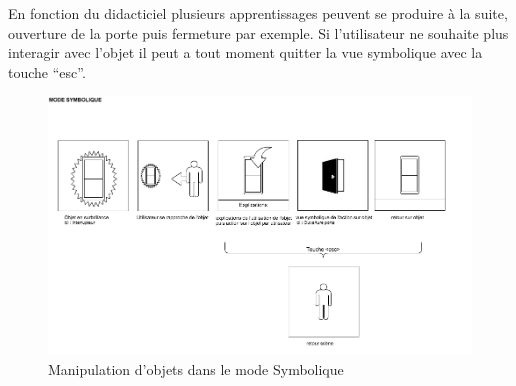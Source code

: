 En fonction du didacticiel plusieurs apprentissages peuvent se produire à la suite, ouverture de la porte puis fermeture par exemple. Si l'utilisateur ne souhaite plus interagir avec l'objet il peut a tout moment quitter la vue symbolique avec la touche \enquote{esc}.

\begin{figure}[h]
\centering
\includegraphics[width=1\textwidth]{2-Specifications/img-utilisateur/symbolique.png}
\caption{\label{fig:MaquetteSymbolique} Manipulation d'objets dans le mode Symbolique }
\end{figure}
